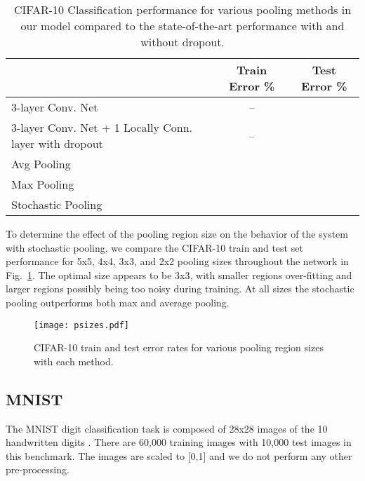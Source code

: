 \documentclass{article} \usepackage{nips12submit_e,times}
\newcommand{\fig}[1]{Fig.~\ref{fig:#1}}
\begin{document}
\begin{table}[h!]
\small
\vspace*{-2mm}
\begin{center}
\begin{tabular}{|l|c|c|}
  \hline
  & Train Error \% & Test Error \% \\
  \hline 3-layer Conv. Net  \cite{Hinton12} & -- &  \\
  \hline 3-layer Conv. Net + 1 Locally Conn. layer with dropout \cite{Hinton12} & -- &  \\
  \hline \hline Avg Pooling &  &  \\
   \hline Max Pooling &  &  \\
   \hline Stochastic Pooling &  &  \\
   \hline
\end{tabular}
\vspace*{-2mm}
\caption{CIFAR-10 Classification performance for various pooling
  methods in our model compared to the state-of-the-art performance
  \cite{Hinton12} with and without dropout.}
\label{tab:cifar}
\vspace*{-2mm}
\end{center}
\end{table}

To determine the effect of the pooling region size on the behavior of
the system with stochastic pooling, we compare the CIFAR-10 train
and test set performance for 5x5, 4x4, 3x3, and 2x2 pooling sizes
throughout the network in \fig{cifar_ps}. The optimal size appears to
be 3x3, with smaller regions over-fitting and larger regions possibly
being too noisy during training. At all sizes the stochastic pooling
outperforms both max and average pooling.


\begin{figure}[h!]
\begin{center}
\texttt{[image: psizes.pdf]}
\end{center}
\vspace*{-0.8cm}
\caption{CIFAR-10 train and test error rates for various pooling region sizes with each method.}
\label{fig:cifar_ps}
\vspace*{-0.5cm}
\end{figure}



\subsection{MNIST}

The MNIST digit classification task is composed of 28x28 images of the
10 handwritten digits \cite{MNIST}. There are 60,000 training images with 10,000
test images in this benchmark. The images are scaled to [0,1] and we do not perform any other
pre-processing.
\end{document}
